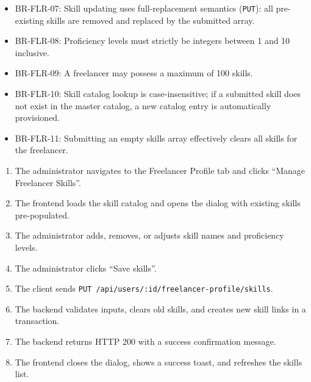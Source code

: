 \begin{itemize}[leftmargin=1.6em,topsep=3pt,itemsep=2pt,parsep=0pt,label=$\bullet$]\brrulelist
    \item BR-FLR-07: Skill updating uses full-replacement semantics (\texttt{PUT}): all pre-existing skills are removed and replaced by the submitted array.
    \item BR-FLR-08: Proficiency levels must strictly be integers between 1 and 10 inclusive.
    \item BR-FLR-09: A freelancer may possess a maximum of 100 skills.
    \item BR-FLR-10: Skill catalog lookup is case-insensitive; if a submitted skill does not exist in the master catalog, a new catalog entry is automatically provisioned.
    \item BR-FLR-11: Submitting an empty skills array effectively clears all skills for the freelancer.
\end{itemize}

\begin{enumerate}[leftmargin=1.6em,topsep=3pt,itemsep=2pt,parsep=0pt]
    \item The administrator navigates to the Freelancer Profile tab and clicks ``Manage Freelancer Skills''.
    \item The frontend loads the skill catalog and opens the dialog with existing skills pre-populated.
    \item The administrator adds, removes, or adjusts skill names and proficiency levels.
    \item The administrator clicks ``Save skills''.
    \item The client sends \texttt{PUT /api/users/:id/freelancer-profile/skills}.
    \item The backend validates inputs, clears old skills, and creates new skill links in a transaction.
    \item The backend returns HTTP 200 with a success confirmation message.
    \item The frontend closes the dialog, shows a success toast, and refreshes the skills list.
\end{enumerate}

